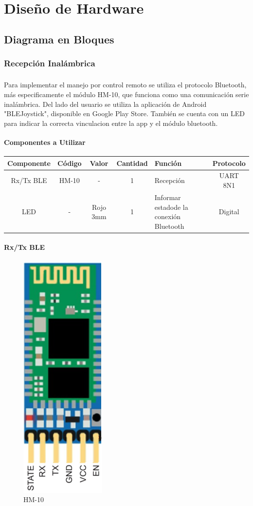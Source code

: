 \chapter{Diseño de Hardware}

\section{Diagrama en Bloques}

\subsection{Recepción Inalámbrica}

\paragraph{}
Para implementar el manejo por control remoto se utiliza el protocolo Bluetooth, 
más especificamente el módulo HM-10, que funciona como una comunicación serie
inalámbrica. Del lado del usuario se utiliza la aplicación de Android
"BLEJoystick", disponible en Google Play Store. También se cuenta con un LED
para indicar la correcta vinculacion entre la app y el módulo bluetooth.

\subsubsection{Componentes a Utilizar}

\begin{longtable}[]{|c|c|c|c|p{3.2cm}|c|}
	\toprule
	Componente & Código & Valor & Cantidad & Función &
	Protocolo\tabularnewline
	\midrule
	\endhead
	Rx/Tx BLE & HM-10 & - & 1 & Recepción & UART
	8N1\tabularnewline
	LED & - & Rojo 3mm & 1 & Informar estado\newline de la conexión Bluetooth &
	Digital\tabularnewline
	\bottomrule
\end{longtable}

\subsubsection{Rx/Tx BLE}

\begin{figure}[H]
	\centering
	\includegraphics[width=0.15\linewidth]{informe_2/encapsulado_HM-10}
	\caption{HM-10}
	\label{fig:encapsuladohm-10}
\end{figure}


